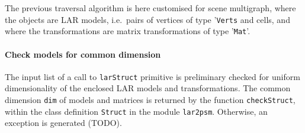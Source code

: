 \documentclass[11pt,oneside]{article}	%
\begin{document}
The previous traversal algorithm is here customised for scene multigraph, where the objects are LAR models, i.e.~pairs of vertices of type '\texttt{Verts} and cells, and where the transformations are matrix transformations of type '\texttt{Mat}'.

\paragraph{Check models for common dimension}
The input list of a call to \texttt{larStruct} primitive is preliminary checked for uniform dimensionality of the enclosed LAR models and transformations. The common dimension \texttt{dim} of models and matrices is returned by the function \texttt{checkStruct}, within the class definition \texttt{Struct} in the module \texttt{lar2psm}. Otherwise, an exception is generated (TODO).
\end{document}

